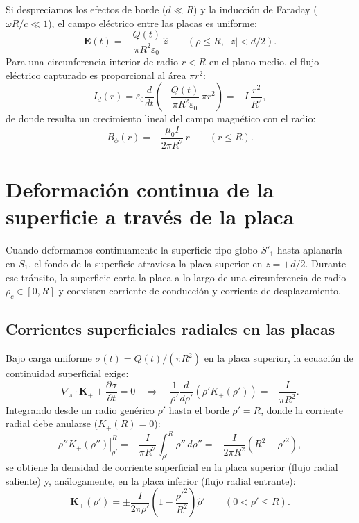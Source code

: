 \documentclass[11pt]{article}
\begin{document}
Si despreciamos los efectos de borde ($d \ll R$) y la inducción de Faraday ($\omega R / c \ll 1$), el campo eléctrico entre las placas es uniforme:
\begin{equation}
    \mathbf{E}(t) = -\frac{Q(t)}{\pi R^2 \varepsilon_0}\,\hat{z} \qquad (\rho \le R,\; |z| < d/2).
\end{equation}
Para una circunferencia interior de radio $r < R$ en el plano medio, el flujo eléctrico capturado es proporcional al área $\pi r^2$:
\begin{equation}
    I_d(r) = \varepsilon_0 \frac{d}{dt}\left( -\frac{Q(t)}{\pi R^2 \varepsilon_0}\,\pi r^2 \right) = -I\,\frac{r^2}{R^2},
\end{equation}
de donde resulta un crecimiento lineal del campo magnético con el radio:
\begin{equation}
    B_\phi(r) = -\frac{\mu_0 I}{2\pi R^2}\,r \qquad (r \le R).
    \label{eq:cuasiestatico-interior}
\end{equation}

\section{Deformación continua de la superficie a través de la placa}

Cuando deformamos continuamente la superficie tipo globo $S'_1$ hasta aplanarla en $S_1$, el fondo de la superficie atraviesa la placa superior en $z = +d/2$. Durante ese tránsito, la superficie corta la placa a lo largo de una circunferencia de radio $\rho_c \in [0, R]$ y coexisten corriente de conducción y corriente de desplazamiento.

\subsection{Corrientes superficiales radiales en las placas}

Bajo carga uniforme $\sigma(t) = Q(t)/(\pi R^2)$ en la placa superior, la ecuación de continuidad superficial exige:
\begin{equation}
    \nabla_s \cdot \mathbf{K}_+ + \frac{\partial \sigma}{\partial t} = 0 \quad \Longrightarrow \quad \frac{1}{\rho'} \frac{d}{d\rho'}\left( \rho' K_+(\rho') \right) = -\frac{I}{\pi R^2}.
\end{equation}
Integrando desde un radio genérico $\rho'$ hasta el borde $\rho' = R$, donde la corriente radial debe anularse ($K_+(R) = 0$):
\begin{equation}
    \left. \rho'' K_+(\rho'') \right|_{\rho'}^{R} = -\frac{I}{\pi R^2} \int_{\rho'}^{R} \rho''\,d\rho'' = -\frac{I}{2\pi R^2}\left( R^2 - \rho'^2 \right),
\end{equation}
se obtiene la densidad de corriente superficial en la placa superior (flujo radial saliente) y, análogamente, en la placa inferior (flujo radial entrante):
\begin{equation}
    \mathbf{K}_{\pm}(\rho') = \pm \frac{I}{2\pi \rho'} \left( 1 - \frac{\rho'^2}{R^2} \right) \hat{\rho}' \qquad (0 < \rho' \le R).
    \label{eq:corriente-radial}
\end{equation}
\end{document}
